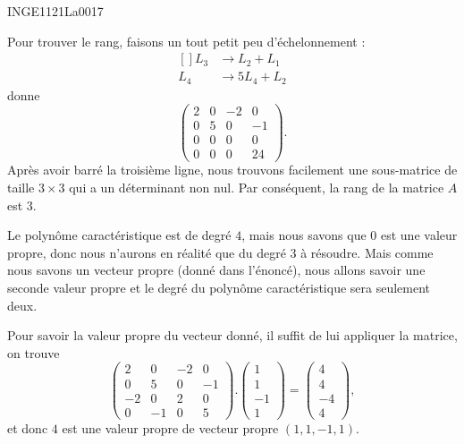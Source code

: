 

\begin{corrige}{INGE1121La0017}

	Pour trouver le rang, faisons un tout petit peu d'échelonnement :
	\begin{equation}
		\begin{aligned}[]
			L_3&\to L_2+L_1\\
			L_4&\to 5L_4+L_2
		\end{aligned}
	\end{equation}
	donne
	\begin{equation}
		\begin{pmatrix}
			 2	&	0	&	-2	&	0	\\
			 0	&	5	&	0	&	-1	\\
			 0	&	0	&	0	&	0	\\ 
			 0	&	0	&	0	&	24	 
		 \end{pmatrix}.
	\end{equation}
	Après avoir barré la troisième ligne, nous trouvons facilement une sous-matrice de taille $3\times 3$ qui a un déterminant non nul. Par conséquent, la rang de la matrice $A$ est $3$.
	
	Le polynôme caractéristique est de degré $4$, mais nous savons que $0$ est une valeur propre, donc nous n'aurons en réalité que du degré $3$ à résoudre. Mais comme nous savons un vecteur propre (donné dans l'énoncé), nous allons savoir une seconde valeur propre et le degré du polynôme caractéristique sera seulement deux.

	Pour savoir la valeur propre du vecteur donné, il suffit de lui appliquer la matrice, on trouve
	\begin{equation}
		\begin{pmatrix}
			 2	&	0	&	-2	&	0	\\
			 0	&	5	&	0	&	-1	\\
			 -2	&	0	&	2	&	0	\\ 
			 0	&	-1	&	0	&	5	 
		 \end{pmatrix}.
		 \begin{pmatrix}
			 1	\\ 
			 1	\\ 
			 -1	\\ 
			 1	
		 \end{pmatrix}=
		 \begin{pmatrix}
			 4	\\ 
			 4	\\ 
			 -4	\\ 
			 4	
		 \end{pmatrix},
	\end{equation}
	et donc $4$ est une valeur propre de vecteur propre $(1,1,-1,1)$.


\end{corrige}

